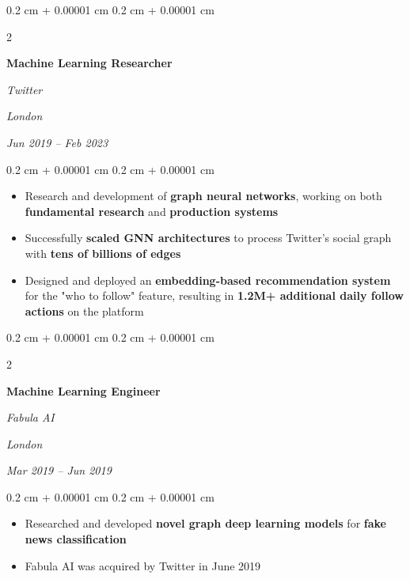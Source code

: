 \documentclass[10pt, letterpaper]{article}
\newenvironment{highlights}{
    \begin{itemize}[
        topsep=0.10 cm,
        parsep=0.10 cm,
        partopsep=0pt,
        itemsep=0pt,
        leftmargin=0.4 cm + 10pt
    ]
}{
    \end{itemize}
} %
\newenvironment{onecolentry}{
    \begin{adjustwidth}{
        0.2 cm + 0.00001 cm
    }{
        0.2 cm + 0.00001 cm
    }
}{
    \end{adjustwidth}
} %
\newenvironment{twocolentry}[2][]{
    \onecolentry
    \def\secondColumn{#2}
    \setcolumnwidth{\fill, 4.5 cm}
    \begin{paracol}{2}
}{
    \switchcolumn \raggedleft \secondColumn
    \end{paracol}
    \endonecolentry
} %
\begin{document}
    \vspace{0.2 cm}

    \begin{twocolentry}{
    \textit{London}
        
    \textit{Jun 2019 – Feb 2023}}
        \textbf{Machine Learning Researcher}
        
        \textit{Twitter}
    \end{twocolentry}

    \vspace{0.10 cm}
    \begin{onecolentry}
        \begin{highlights}
            \item Research and development of \textbf{graph neural networks}, working on both \textbf{fundamental research} and \textbf{production systems}
            \item Successfully \textbf{scaled GNN architectures} to process Twitter's social graph with \textbf{tens of billions of edges}
            \item Designed and deployed an \textbf{embedding-based recommendation system} for the "who to follow" feature, resulting in \textbf{1.2M+ additional daily follow actions} on the platform
        \end{highlights}
    \end{onecolentry}

    \vspace{0.2 cm}

    \begin{twocolentry}{
    \textit{London}
        
    \textit{Mar 2019 – Jun 2019}}
        \textbf{Machine Learning Engineer}
        
        \textit{Fabula AI}
    \end{twocolentry}

    \vspace{0.10 cm}
    \begin{onecolentry}
        \begin{highlights}
            \item Researched and developed \textbf{novel graph deep learning models} for \textbf{fake news classification}
            \item Fabula AI was acquired by Twitter in June 2019
        \end{highlights}
    \end{onecolentry}

    \vspace{0.2 cm}
\end{document}
